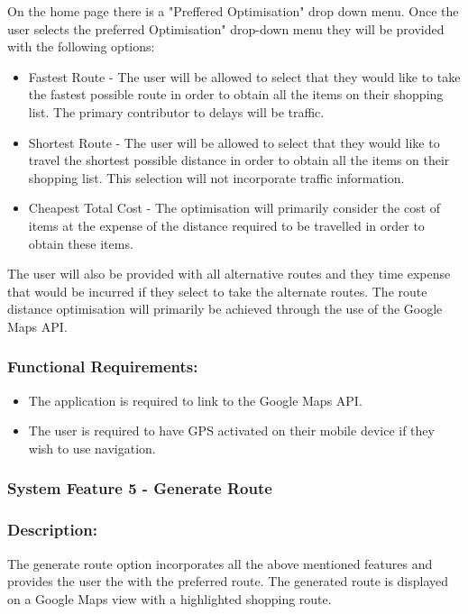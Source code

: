 \documentclass[10pt,twocolumn]{witseiepaper}
\begin{document}
		On the home page there is a "Preffered Optimisation" drop down menu. Once the user selects the preferred Optimisation" drop-down menu they will be provided with the following options:
		
		\begin{itemize}
			\item Fastest Route - The user will be allowed to select that they would like to take the fastest possible route in order to obtain all the items on their shopping list. The primary contributor to delays will be traffic.
			\item Shortest Route - The user will be allowed to select that they would like to travel the shortest possible distance in order to obtain all the items on their shopping list. This selection will not incorporate traffic information.
			\item Cheapest Total Cost - The optimisation will primarily consider the cost of items at the expense of the distance required to be travelled in order to obtain these items. 
		\end{itemize}
		
		The user will also be provided with all alternative routes and they time expense that would be incurred if they select to take the alternate routes. The route distance optimisation will primarily be achieved through the use of the Google Maps API.
		
		\subsubsection*{Functional Requirements:}
		
		\begin{itemize}
			\item The application is required to link to the Google Maps API. 
			\item The user is required to have GPS activated on their mobile device if they wish to use navigation.
		\end{itemize}
		
		\subsubsection{System Feature 5 - Generate Route}
		
		\subsubsection*{Description:}
		
		The generate route option incorporates all the above mentioned features and provides the user the with the preferred route. The generated route is displayed on a Google Maps view with a highlighted shopping route. 
		
\end{document}
